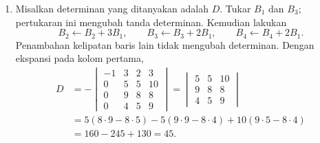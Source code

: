 \documentclass[11pt,a4paper]{article}
\begin{document}
\begin{enumerate}
    \item Misalkan determinan yang ditanyakan adalah $D$. Tukar $B_1$ dan $B_3$; pertukaran ini mengubah tanda determinan. Kemudian lakukan
    \[
        B_2\leftarrow B_2+3B_1,\qquad
        B_3\leftarrow B_3+2B_1,\qquad
        B_4\leftarrow B_4+2B_1.
    \]
    Penambahan kelipatan baris lain tidak mengubah determinan. Dengan ekspansi pada kolom pertama,
    \begin{align*}
        D&=-\begin{vmatrix}
            -1&3&2&3\\
            0&5&5&10\\
            0&9&8&8\\
            0&4&5&9
        \end{vmatrix}
        =\begin{vmatrix}5&5&10\\9&8&8\\4&5&9\end{vmatrix}\\
        &=5(8\cdot9-8\cdot5)
          -5(9\cdot9-8\cdot4)
          +10(9\cdot5-8\cdot4)\\
        &=160-245+130=\boxed{45}.
    \end{align*}
\end{enumerate}
\end{document}
